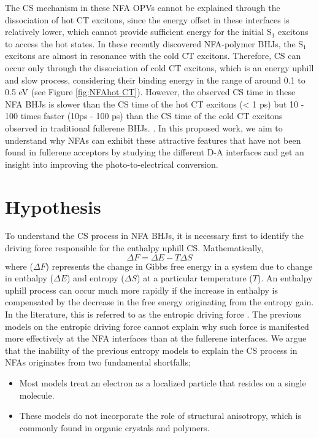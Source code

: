 \documentclass[12pt]{article}
\begin{document}
The CS mechanism in these NFA OPVs cannot be explained through the dissociation of hot CT excitons, since the energy offset in these interfaces is relatively lower, which cannot provide sufficient energy for the initial S$_1$ excitons to access the hot states. In these recently discovered NFA-polymer BHJs, the S$_1$ excitons are almost in resonance with the cold CT excitons. Therefore, CS can occur only through the dissociation of cold CT excitons, which is an energy uphill and slow process, considering their binding energy in the range of around 0.1 to 0.5 eV (see Figure \ref{fig:NFAhot CT}). However, the observed CS time in these NFA BHJs is slower than the CS time of the hot CT excitons (< 1 ps) but 10 - 100 times faster (10ps - 100 ps) than the CS time of the cold CT excitons observed in traditional fullerene BHJs.  \cite{qian2018design,dimitrov2019spectroscopic,menke2018order,liu2018unexpectedly}. In this proposed work, we aim to understand why NFAs can exhibit these attractive features that have not been found in fullerene acceptors by studying the different D-A interfaces and get an insight into improving the photo-to-electrical conversion. 

\section{Hypothesis}
To understand the CS process in NFA BHJs, it is necessary first to identify the driving force responsible for the enthalpy uphill CS. Mathematically,
\begin{equation}
    \Delta F = \Delta E - T\Delta S
\end{equation}
where ($\Delta F$) represents the change in Gibbs free energy in a system due to change in enthalpy ($\Delta E$) and entropy ($\Delta S$) at a particular temperature ($T$). An enthalpy uphill process can occur much more rapidly if the increase in enthalpy is compensated by the decrease in the free energy originating from the entropy gain. In the literature, this is referred to as the entropic driving force \cite{clarke2010charge,monahan2015direct,gregg2011entropy,hood2016entropy}. The previous models on the entropic driving force cannot explain why such force is manifested more effectively at the NFA interfaces than at the fullerene interfaces. We argue that the inability of the previous entropy models to explain the CS process in NFAs originates from two fundamental shortfalls;
\begin{itemize}
    \item Most models treat an electron as a localized particle that resides on a single molecule.
    \item These models do not incorporate the role of structural anisotropy, which is commonly found in organic crystals and polymers.
\end{itemize}
\end{document}
